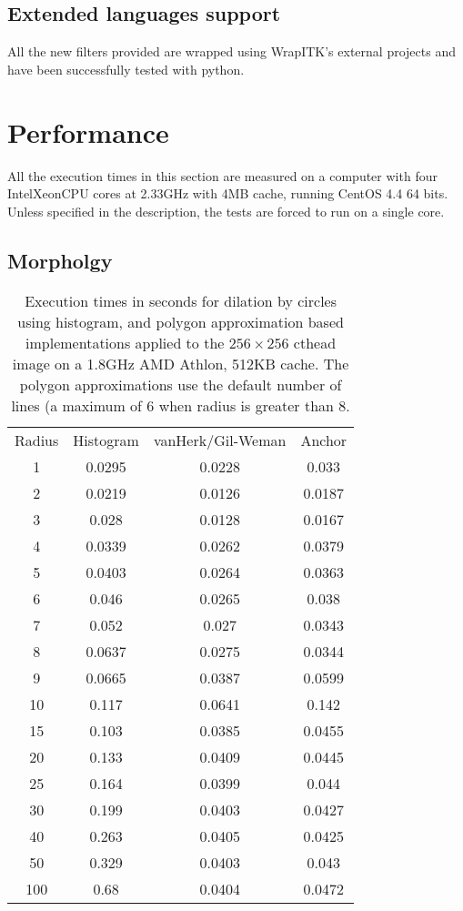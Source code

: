 \documentclass{InsightArticle}
\begin{document}
\subsection{Extended languages support}

All the new filters provided are wrapped using WrapITK's external projects
\cite{WrapITK} and have been successfully tested with python.

\section{Performance}

All the execution times in this section are measured on a computer with four
Intel\textregistered Xeon\textregistered CPU cores at 2.33GHz with 4MB cache,
running CentOS 4.4 64 bits. Unless specified in the description, the tests are
forced to run on a single core.

\subsection{Morpholgy}
\begin{table}[htbp]
\centering
\begin{tabular}{cccc}
\hline
Radius & Histogram & vanHerk/Gil-Weman & Anchor \\
1    &   0.0295  & 0.0228  & 0.033 \\
2    &   0.0219  & 0.0126  & 0.0187 \\
3    &   0.028   & 0.0128  & 0.0167 \\
4    &   0.0339  & 0.0262  & 0.0379 \\ 
5    &   0.0403  & 0.0264  & 0.0363 \\
6    &   0.046   & 0.0265  & 0.038 \\
7    &   0.052   & 0.027   & 0.0343 \\
8    &   0.0637  & 0.0275  & 0.0344 \\
9    &   0.0665  & 0.0387  & 0.0599 \\
10   &   0.117   & 0.0641  & 0.142 \\
15   &   0.103   & 0.0385  & 0.0455 \\
20   &   0.133   & 0.0409  & 0.0445 \\
25   &   0.164   & 0.0399  & 0.044 \\
30   &   0.199   & 0.0403  & 0.0427 \\
40   &   0.263   & 0.0405  & 0.0425 \\
50   &   0.329   & 0.0403  & 0.043 \\
100  &   0.68    & 0.0404  &  0.0472 \\
\hline
\hline
\end{tabular}
\caption{Execution times in seconds for dilation by circles using histogram, and polygon approximation based implementations applied to the $256 \times 256$ cthead image on a 1.8GHz AMD Athlon, 512KB cache. The polygon approximations use the default number of lines (a maximum of 6 when radius is greater than 8.\label{tab:perfPoly}}
\end{table}
\end{document}
